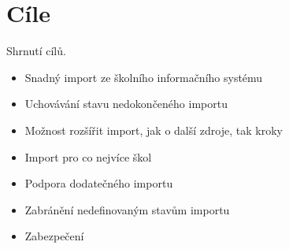 \newpage
\section{Cíle}
Shrnutí cílů.
\begin{itemize}
    \item Snadný import ze školního informačního systému
    \item Uchovávání stavu nedokončeného importu
    \item Možnost rozšířit import, jak o další zdroje, tak kroky
    \item Import pro co nejvíce škol
    \item Podpora dodatečného importu
    \item Zabránění nedefinovaným stavům importu
    \item Zabezpečení
\end{itemize}
